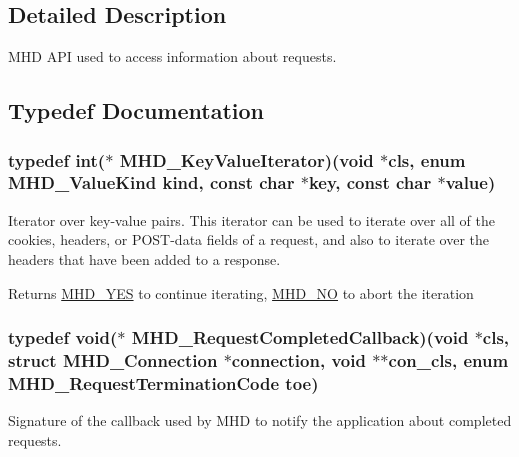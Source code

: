 \subsection{\-Detailed \-Description}
\-M\-H\-D \-A\-P\-I used to access information about requests. 

\subsection{\-Typedef \-Documentation}
\hypertarget{group__request_ga4a3cbf233bf4c7ffabeb3e85490ff464}{
\subsubsection[{\-M\-H\-D\-\_\-\-Key\-Value\-Iterator}]{\setlength{\rightskip}{0pt plus 5cm}typedef int($\ast$ {\bf \-M\-H\-D\-\_\-\-Key\-Value\-Iterator})(void $\ast$cls, enum {\bf \-M\-H\-D\-\_\-\-Value\-Kind} kind, const char $\ast$key, const char $\ast$value)}}\label{group__request_ga4a3cbf233bf4c7ffabeb3e85490ff464}
\-Iterator over key-\/value pairs. \-This iterator can be used to iterate over all of the cookies, headers, or \-P\-O\-S\-T-\/data fields of a request, and also to iterate over the headers that have been added to a response.

\begin{DoxyReturn}{\-Returns}
\hyperlink{microhttpd_8h_a802c6784232db3736734807f2fb54e5c}{\-M\-H\-D\-\_\-\-Y\-E\-S} to continue iterating, \hyperlink{microhttpd_8h_a741a3f020f0a97d89f4566d27e606d5f}{\-M\-H\-D\-\_\-\-N\-O} to abort the iteration 
\end{DoxyReturn}
\hypertarget{group__request_gab8cf19682c45b3b5aead1294623a4184}{
\subsubsection[{\-M\-H\-D\-\_\-\-Request\-Completed\-Callback}]{\setlength{\rightskip}{0pt plus 5cm}typedef void($\ast$ {\bf \-M\-H\-D\-\_\-\-Request\-Completed\-Callback})(void $\ast$cls, struct \-M\-H\-D\-\_\-\-Connection $\ast$connection, void $\ast$$\ast$con\-\_\-cls, enum {\bf \-M\-H\-D\-\_\-\-Request\-Termination\-Code} toe)}}\label{group__request_gab8cf19682c45b3b5aead1294623a4184}
\-Signature of the callback used by \-M\-H\-D to notify the application about completed requests.


